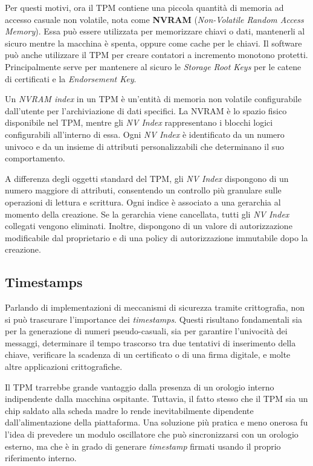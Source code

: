 Per questi motivi, ora il TPM contiene una piccola quantità di memoria ad accesso casuale non volatile, nota come \textbf{NVRAM} (\textit{Non-Volatile Random Access Memory}). Essa può essere utilizzata per memorizzare chiavi o dati, mantenerli al sicuro mentre la macchina è spenta, oppure come cache per le chiavi. Il software può anche utilizzare il TPM per creare contatori a incremento monotono protetti. Principalmente serve per mantenere al sicuro le \textit{Storage Root Keys} per le catene di certificati e la \textit{Endorsement Key}. 

Un \textit{NVRAM index} in un TPM è un'entità di memoria non volatile configurabile dall’utente per l’archiviazione di dati specifici. La NVRAM è lo spazio fisico disponibile nel TPM, mentre gli \textit{NV Index} rappresentano i blocchi logici configurabili all'interno di essa. Ogni \textit{NV Index} è identificato da un numero univoco e da un insieme di attributi personalizzabili che determinano il suo comportamento. 

A differenza degli oggetti standard del TPM, gli \textit{NV Index} dispongono di un numero maggiore di attributi, consentendo un controllo più granulare sulle operazioni di lettura e scrittura. Ogni indice è associato a una gerarchia al momento della creazione. Se la gerarchia viene cancellata, tutti gli \textit{NV Index} collegati vengono eliminati. Inoltre, dispongono di un valore di autorizzazione modificabile dal proprietario e di una policy di autorizzazione immutabile dopo la creazione.

\subsection{Timestamps}
Parlando di implementazioni di meccanismi di sicurezza tramite crittografia, non si può trascurare l'importance dei \textit{timestamps}. Questi risultano fondamentali sia per la generazione di numeri pseudo-casuali, sia per garantire l’univocità dei messaggi, determinare il tempo trascorso tra due tentativi di inserimento della chiave, verificare la scadenza di un certificato o di una firma digitale, e molte altre applicazioni crittografiche.

Il TPM trarrebbe grande vantaggio dalla presenza di un orologio interno indipendente dalla macchina ospitante. Tuttavia, il fatto stesso che il TPM sia un chip saldato alla scheda madre lo rende inevitabilmente dipendente dall’alimentazione della piattaforma. Una soluzione più pratica e meno onerosa fu l’idea di prevedere un modulo oscillatore che può sincronizzarsi con un orologio esterno, ma che è in grado di generare \textit{timestamp} firmati usando il proprio riferimento interno.

